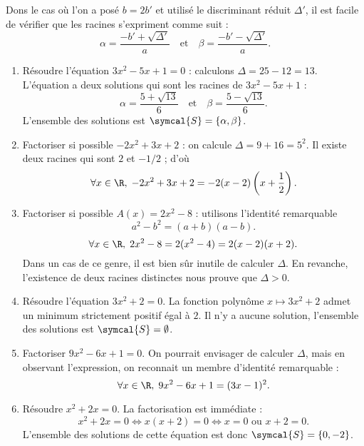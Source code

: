 \begin{remark}
Dons le cas où l'on a posé $b=2b'$ et utilisé le discriminant réduit $\Delta'$, il est facile de vérifier que les racines s'expriment comme suit :
\[
\alpha=\frac{-b'+\sqrt{\Delta'}}{a}\quad\text{et}\quad\beta=\frac{-b'-\sqrt{\Delta'}}{a}.
\]
\end{remark}

\begin{example}[Exemples]
\begin{enumerate}
\item Résoudre l'équation $3x^2-5x+1=0$ : calculons $\Delta=25-12=13$. L'équation a deux solutions qui sont les racines de $3x^2-5x+1$ :
\[
\alpha=\frac{5+\sqrt{13}}{6}\quad\text{et}\quad\beta=\frac{5-\sqrt{13}}{6}.
\]
L'ensemble des solutions est $\symcal{S}=\{\alpha,\beta\}$.
\item Factoriser si possible $-2x^2+3x+2$ : on calcule $\Delta=9+16=5^2$. Il existe deux racines qui sont $2$ et $-1/2$ ; d'où
\[
\forall x\in\R,\;-2x^2+3x+2=-2(x-2)\left(x+\frac12\right).
\]
\item Factoriser si possible $A(x)=2x^2-8$ : utilisons  l'identité remarquable 
\[
a^2-b^2=(a+b)(a-b).
\]
\[\forall x\in\R,\;2x^2-8=2(x^2-4)=2(x-2)(x+2).\]
Dans un cas de ce genre, il est bien sûr inutile de calculer $\Delta$. En revanche, l'existence de deux racines distinctes nous prouve que $\Delta>0$.
\item Résoudre l'équation $3x^2+2=0$. La fonction polynôme $x\mapsto3x^2+2$ admet un minimum strictement positif égal à $2$. Il n'y a aucune solution, l'ensemble des solutions est $\symcal{S}=\emptyset$.
\item Factoriser $9x^2-6x+1=0$. On pourrait envisager de calculer $\Delta$, mais en observant l'expression, on reconnait un membre d'identité remarquable :
\[\forall x\in\R,\;9x^2-6x+1=(3x-1)^2.\]
\item Résoudre $x^2+2x=0$. La factorisation est immédiate :
\[x^2+2x=0\iff x(x+2)=0\iff x=0\text{ ou }x+2=0.\]
L'ensemble des solutions de cette équation est donc $\symcal{S}=\{0,-2\}$.
\end{enumerate}
\end{example}
%
%

